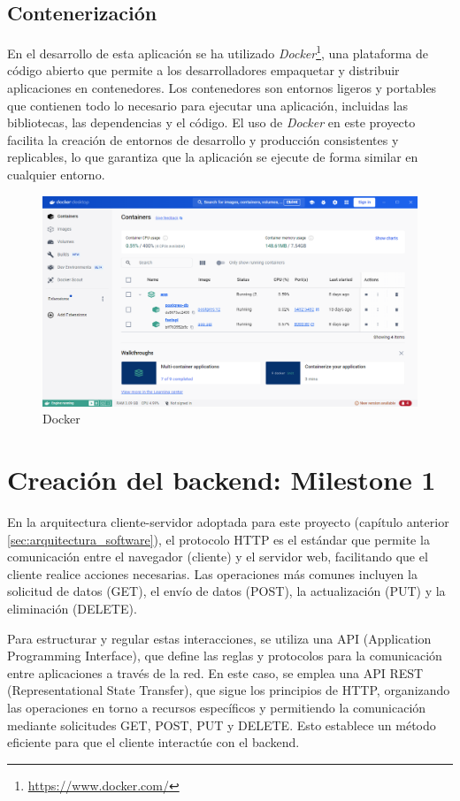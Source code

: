 \subsection{Contenerización}
En el desarrollo de esta aplicación se ha utilizado \textit{Docker}\footnote{\url{https://www.docker.com/}}, una plataforma de código abierto que permite a los desarrolladores empaquetar y distribuir aplicaciones en contenedores. Los contenedores son entornos ligeros y portables que contienen todo lo necesario para ejecutar una aplicación, incluidas las bibliotecas, las dependencias y el código. El uso de \textit{Docker} en este proyecto facilita la creación de entornos de desarrollo y producción consistentes y replicables, lo que garantiza que la aplicación se ejecute de forma similar en cualquier entorno.
\begin{figure}[ht!]
    \centering
    \includegraphics[width=\linewidth]{imagenes/docker.png}
    \caption{Docker}
    \label{fig:docker}
\end{figure}


\section{Creación del backend: Milestone 1}
En la arquitectura cliente-servidor adoptada para este proyecto (capítulo anterior \ref{sec:arquitectura_software}), el protocolo HTTP es el estándar que permite la comunicación entre el navegador (cliente) y el servidor web, facilitando que el cliente realice acciones necesarias. Las operaciones más comunes incluyen la solicitud de datos (GET), el envío de datos (POST), la actualización (PUT) y la eliminación (DELETE).

Para estructurar y regular estas interacciones, se utiliza una API (Application Programming Interface), que define las reglas y protocolos para la comunicación entre aplicaciones a través de la red. En este caso, se emplea una API REST (Representational State Transfer), que sigue los principios de HTTP, organizando las operaciones en torno a recursos específicos y permitiendo la comunicación mediante solicitudes GET, POST, PUT y DELETE. Esto establece un método eficiente para que el cliente interactúe con el backend.

